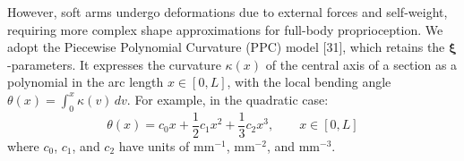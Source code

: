 However, soft arms undergo deformations due to external forces and self-weight, requiring more complex shape approximations for full-body proprioception. We adopt the Piecewise Polynomial Curvature (PPC) model [31], which retains the $\boldsymbol{\xi}$-parameters. It expresses the curvature $\kappa(x)$ of the central axis of a section as a polynomial in the arc length $x \in [0, L]$, with the local bending angle $\theta(x) = \int_0^x \kappa(v)\, dv$. For example, in the quadratic case:
\begin{equation}
\theta(x) = c_0 x + \frac{1}{2} c_1 x^2 + \frac{1}{3} c_2 x^3, \qquad x \in [0, L]
\end{equation}
where $c_0$, $c_1$, and $c_2$ have units of mm$^{-1}$, mm$^{-2}$, and mm$^{-3}$.
